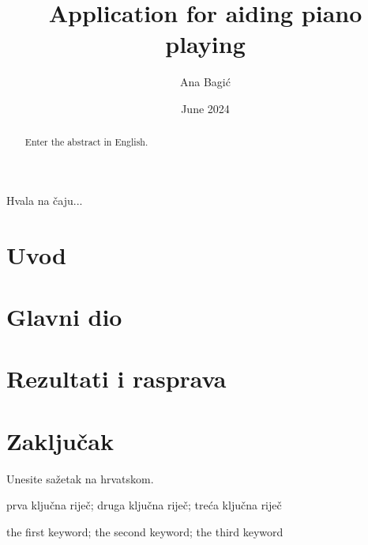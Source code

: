 \documentclass[diplomskirad]{fer}
\title{Application for aiding piano playing}
\author{Ana Bagić}
\date{June 2024}
\begin{document}
\maketitle




\begin{zahvale}
  Hvala na čaju...
\end{zahvale}


\mainmatter


\tableofcontents


\chapter{Uvod}
\label{pog:uvod}



\chapter{Glavni dio}
\label{pog:glavni_dio}

\blindtext



\chapter{Rezultati i rasprava}
\label{pog:rezultati_i_rasprava}

\blindtext



\chapter{Zaključak}
\label{pog:zakljucak}

\blindtext







\begin{sazetak}
  Unesite sažetak na hrvatskom.

  \blindtext
\end{sazetak}

\begin{kljucnerijeci}
  prva ključna riječ; druga ključna riječ; treća ključna riječ
\end{kljucnerijeci}


\begin{abstract}
  Enter the abstract in English.
  
  \blindtext 
\end{abstract}

\begin{keywords}
  the first keyword; the second keyword; the third keyword
\end{keywords}
\end{document}
